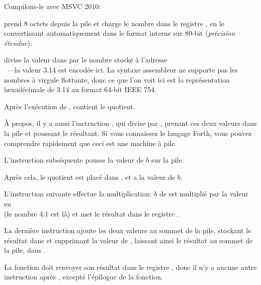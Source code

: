 
Compilons-le avec MSVC 2010:



\FLD prend 8 octets depuis la pile et charge le nombre dans le registre , en
le convertissant automatiquement dans le format interne sur 80-bit (\emph{précision
étendue}):


\FDIV divise la valeur dans  par le nombre stocké à l'adresse \\
~---la valeur 3.14 est encodée ici.
La syntaxe assembleur ne supporte pas les nombres à virgule flottante, donc ce que
l'on voit ici est la représentation hexadécimale de 3.14 au format 64-bit IEEE 754.

Après l'exécution de \FDIV,  contient le \gls{quotient}.


À propos, il y a aussi l'instruction \FDIVP, qui divise  par , prenant
ces deux valeurs dans la pile et poussant le résultant.
Si vous connaissez le langage Forth\FNURLFORTH, vous pouvez comprendre rapidement
que ceci est une machine à pile\FNURLSTACK.

L'instruction \FLD subséquente pousse la valeur de $b$ sur la pile.

Après cela, le quotient est placé dans , et  a la valeur de $b$.


L'instruction suivante effectue la multiplication: $b$ de  est multiplié par
la valeur en\\
 (le nombre 4.1 est là) et met le résultat
dans le registre .


La dernière instruction \FADDP ajoute les deux valeurs au sommet de la pile, stockant
le résultat dans  et supprimant la valeur de , laissant ainsi le résultat
au sommet de la pile, dans .

La fonction doit renvoyer son résultat dans le registre , donc il n'y a aucune
autre instruction après \FADDP, excepté l'épilogue de la fonction.


